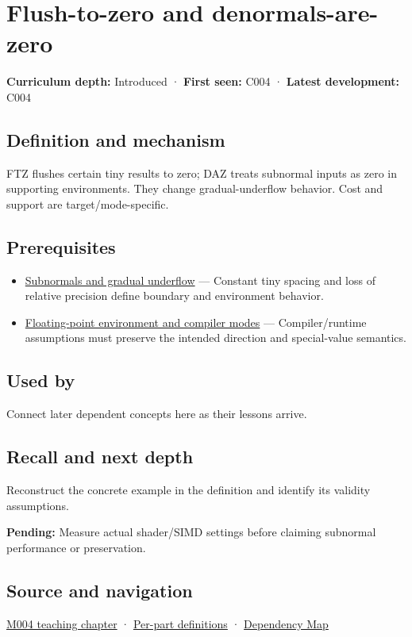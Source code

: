 \hypertarget{appendix-e979eb012782}{}\label{referencestart:appendix-e979eb012782}
\section{Flush-to-zero and denormals-are-zero}\label{appendix-e979eb012782-flush-to-zero-and-denormals-are-zero}

\textbf{Curriculum depth:} Introduced · \textbf{First seen:} C004 · \textbf{Latest development:} C004

\subsection{Definition and mechanism}\label{appendix-e979eb012782-definition-and-mechanism}

FTZ flushes certain tiny results to zero; DAZ treats subnormal inputs as zero in supporting environments. They change gradual-underflow behavior. Cost and support are target/mode-specific.

\subsection{Prerequisites}\label{appendix-e979eb012782-prerequisites}

\begin{itemize}
\tightlist
\item
  \hyperref[appendix-00a6e044c437]{Subnormals and gradual underflow} --- Constant tiny spacing and loss of relative precision define boundary and environment behavior.
\item
  \hyperref[appendix-f11d1a521253]{Floating-point environment and compiler modes} --- Compiler/runtime assumptions must preserve the intended direction and special-value semantics.
\end{itemize}

\subsection{Used by}\label{appendix-e979eb012782-used-by}

Connect later dependent concepts here as their lessons arrive.

\subsection{Recall and next depth}\label{appendix-e979eb012782-recall-and-next-depth}

Reconstruct the concrete example in the definition and identify its validity assumptions.

\textbf{Pending:} Measure actual shader/SIMD settings before claiming subnormal performance or preservation.

\subsection{Source and navigation}\label{appendix-e979eb012782-source-and-navigation}

\hyperref[01-foundations-i-ch001-a-stretching-ruler-for-real-valued-quantities]{M004 teaching chapter} · \hyperref[appendix-fd090d982a15-m004---parts-61-76]{Per-part definitions} · \hyperref[appendix-4ad47bdd269a]{Dependency Map}
